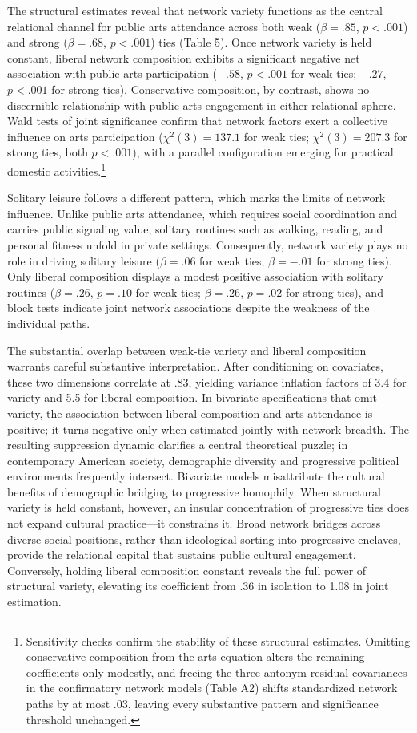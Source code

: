 \documentclass[
  12pt
]{article}
\begin{document}
The structural estimates reveal that network variety functions as the central relational channel for public arts attendance across both weak ($\beta = .85$, $p < .001$) and strong ($\beta = .68$, $p < .001$) ties (Table 5). Once network variety is held constant, liberal network composition exhibits a significant negative net association with public arts participation ($-.58$, $p < .001$ for weak ties; $-.27$, $p < .001$ for strong ties). Conservative composition, by contrast, shows no discernible relationship with public arts engagement in either relational sphere. Wald tests of joint significance confirm that network factors exert a collective influence on arts participation ($\chi^2(3) = 137.1$ for weak ties; $\chi^2(3) = 207.3$ for strong ties, both $p < .001$), with a parallel configuration emerging for practical domestic activities.\footnote{Sensitivity checks confirm the stability of these structural estimates. Omitting conservative composition from the arts equation alters the remaining coefficients only modestly, and freeing the three antonym residual covariances in the confirmatory network models (Table A2) shifts standardized network paths by at most .03, leaving every substantive pattern and significance threshold unchanged.}

Solitary leisure follows a different pattern, which marks the limits of network influence. Unlike public arts attendance, which requires social coordination and carries public signaling value, solitary routines such as walking, reading, and personal fitness unfold in private settings. Consequently, network variety plays no role in driving solitary leisure ($\beta = .06$ for weak ties; $\beta = -.01$ for strong ties). Only liberal composition displays a modest positive association with solitary routines ($\beta = .26$, $p = .10$ for weak ties; $\beta = .26$, $p = .02$ for strong ties), and block tests indicate joint network associations despite the weakness of the individual paths.

The substantial overlap between weak-tie variety and liberal composition warrants careful substantive interpretation. After conditioning on covariates, these two dimensions correlate at .83, yielding variance inflation factors of 3.4 for variety and 5.5 for liberal composition. In bivariate specifications that omit variety, the association between liberal composition and arts attendance is positive; it turns negative only when estimated jointly with network breadth. The resulting suppression dynamic clarifies a central theoretical puzzle; in contemporary American society, demographic diversity and progressive political environments frequently intersect. Bivariate models misattribute the cultural benefits of demographic bridging to progressive homophily. When structural variety is held constant, however, an insular concentration of progressive ties does not expand cultural practice---it constrains it. Broad network bridges across diverse social positions, rather than ideological sorting into progressive enclaves, provide the relational capital that sustains public cultural engagement. Conversely, holding liberal composition constant reveals the full power of structural variety, elevating its coefficient from .36 in isolation to 1.08 in joint estimation.
\end{document}
